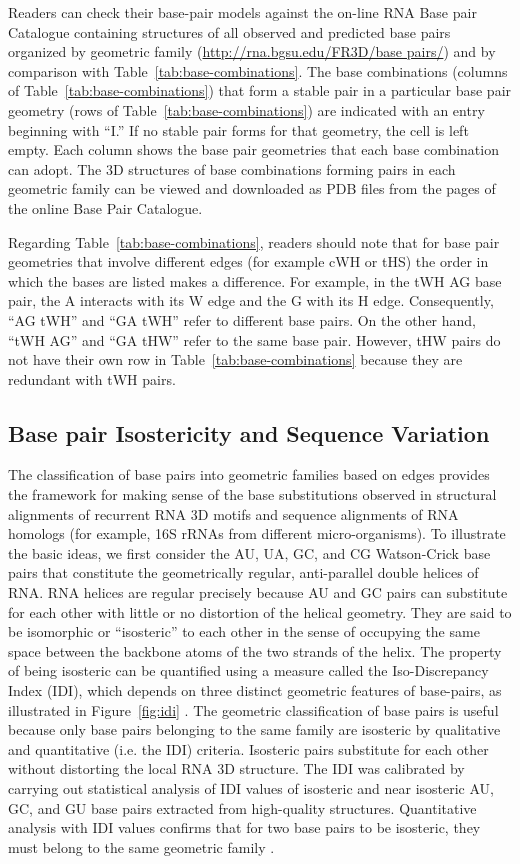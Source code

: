 Readers can check their base-pair models against the on-line RNA Base pair
Catalogue containing structures of all observed and predicted base pairs
organized by geometric family (\url{http://rna.bgsu.edu/FR3D/base pairs/}) and
by comparison with Table~\ref{tab:base-combinations}. The base combinations
(columns of Table~\ref{tab:base-combinations}) that form a stable pair in a
particular base pair geometry (rows of Table~\ref{tab:base-combinations}) are
indicated with an entry beginning with ``I.'' If no stable pair forms for that
geometry, the cell is left empty. Each column shows the base pair geometries
that each base combination can adopt. The 3D structures of base combinations
forming pairs in each geometric family can be viewed and downloaded as PDB files
from the pages of the online Base Pair Catalogue. 

Regarding Table~\ref{tab:base-combinations}, readers should note that for base pair geometries that
involve different edges (for example cWH or tHS) the order in which the bases
are listed makes a difference. For example, in the tWH AG base pair, the A
interacts with its W edge and the G with its H edge. Consequently, ``AG tWH''
and ``GA tWH'' refer to different base pairs. On the other hand, ``tWH AG'' and
``GA tHW'' refer to the same base pair. However, tHW pairs do not have their own
row in Table~\ref{tab:base-combinations} because they are redundant with tWH pairs. 

\subsection{Base pair Isostericity and Sequence Variation}

The classification of base pairs into geometric families based on edges provides
the framework for making sense of the base substitutions observed in structural
alignments of recurrent RNA 3D motifs and sequence alignments of RNA homologs
(for example, 16S rRNAs from different micro-organisms). To illustrate the basic
ideas, we first consider the AU, UA, GC, and CG Watson-Crick base pairs that
constitute the geometrically regular, anti-parallel double helices of RNA. RNA
helices are regular precisely because AU and GC pairs can substitute for each
other with little or no distortion of the helical geometry. They are said to be
isomorphic or “isosteric” to each other in the sense of occupying the same space
between the backbone atoms of the two strands of the helix. The property of
being isosteric can be quantified using a measure called the Iso-Discrepancy
Index (IDI), which depends on three distinct geometric features of base-pairs,
as illustrated in Figure~\ref{fig:idi} \cite{Stombaugh2009}. The geometric
classification of base pairs is useful because only base pairs belonging to the
same family are isosteric by qualitative and quantitative (i.e. the IDI)
criteria. Isosteric pairs substitute for each other without distorting the local
RNA 3D structure. The IDI was calibrated by carrying out statistical analysis of
IDI values of isosteric and near isosteric AU, GC, and GU base pairs extracted
from high-quality structures. Quantitative analysis with IDI values confirms
that for two base pairs to be isosteric, they must belong to the same geometric
family \cite{Stombaugh2009}. 

